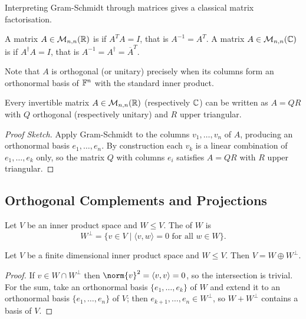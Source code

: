 \documentclass[a4paper]{scrartcl}
\begin{document}
Interpreting Gram-Schmidt through matrices gives a classical matrix factorisation.

\begin{definition}
    A matrix $A \in \mathcal{M}_{n,n}(\mathbb{R})$ is  if $A^TA = I$, that is $A^{-1} = A^T$. A matrix $A \in \mathcal{M}_{n,n}(\mathbb{C})$ is  if $A^\dagger A = I$, that is $A^{-1} = A^\dagger = \overline{A}^T$.
\end{definition}

Note that $A$ is orthogonal (or unitary) precisely when its columns form an orthonormal basis of $\mathbb{F}^n$ with the standard inner product.

\begin{proposition}[QR Decomposition]
    Every invertible matrix $A \in \mathcal{M}_{n,n}(\mathbb{R})$ (respectively $\mathbb{C}$) can be written as $A = QR$ with $Q$ orthogonal (respectively unitary) and $R$ upper triangular.
\end{proposition}
\begin{proof}[Proof Sketch]
    Apply Gram-Schmidt to the columns $v_1, \dots, v_n$ of $A$, producing an orthonormal basis $e_1, \dots, e_n$. By construction each $v_k$ is a linear combination of $e_1, \dots, e_k$ only, so the matrix $Q$ with columns $e_i$ satisfies $A = QR$ with $R$ upper triangular.
\end{proof}

\subsection{Orthogonal Complements and Projections}

\begin{definition}
    Let $V$ be an inner product space and $W \leq V$. The  of $W$ is
    $$
    W^\perp = \{ v \in V \mid \langle v, w \rangle = 0 \text{ for all } w \in W\}.
    $$
\end{definition}

\begin{lemma}
    Let $V$ be a finite dimensional inner product space and $W \leq V$. Then $V = W \oplus W^\perp$.
\end{lemma}
\begin{proof}
    If $v \in W \cap W^\perp$ then $\norm{v}^2 = \langle v, v \rangle = 0$, so the intersection is trivial. For the sum, take an orthonormal basis $\{e_1, \dots, e_k\}$ of $W$ and extend it to an orthonormal basis $\{e_1, \dots, e_n\}$ of $V$; then $e_{k + 1}, \dots, e_n \in W^\perp$, so $W + W^\perp$ contains a basis of $V$.
\end{proof}
\end{document}
